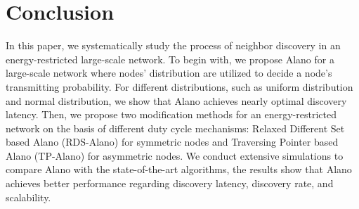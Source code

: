 \section{Conclusion}
\label{Conclusion}
In this paper, we systematically study the process of neighbor discovery in an energy-restricted large-scale network. To begin with, we propose Alano for a large-scale network where nodes' distribution are utilized to decide a node's transmitting probability. For different distributions, such as uniform distribution and normal distribution, we show that Alano achieves nearly optimal discovery latency. Then, we propose two modification methods for an energy-restricted network on the basis of different duty cycle mechanisms: Relaxed Different Set based Alano (RDS-Alano) for symmetric nodes and Traversing Pointer based Alano (TP-Alano) for asymmetric nodes. We conduct extensive simulations to compare Alano with the state-of-the-art algorithms, the results show that Alano achieves better performance regarding discovery latency, discovery rate, and scalability.%
